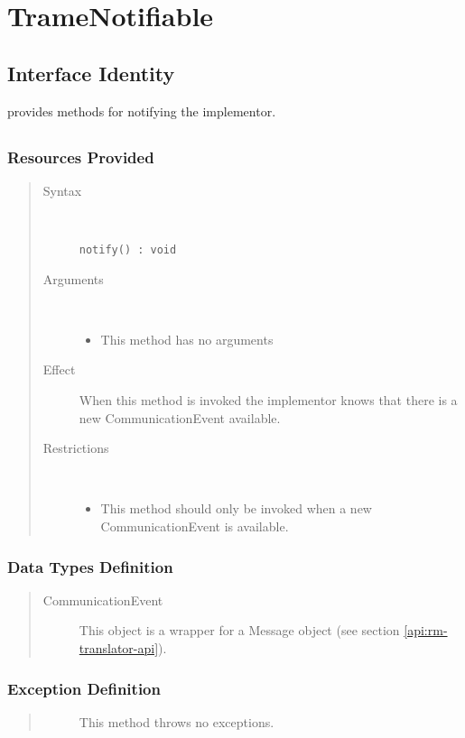 \section{TrameNotifiable}
\label{api:rm-trame-notifiable}

\subsection{Interface Identity}

\npar {} provides methods for notifying the
implementor.

\subsection{}

\subsubsection{Resources Provided}

\begin{quote}
	\begin{description}
		\item[Syntax] \
		\begin{verbatim}
notify() : void
		\end{verbatim}
		\item[Arguments] \
		\begin{itemize}
		  \item This method has no arguments
		\end{itemize}
		\item[Effect] When this method is invoked the implementor knows that there is
		a new CommunicationEvent available.
		\item[Restrictions] \
		\begin{itemize}
		  \item This method should only be invoked when a new CommunicationEvent is
		  available.
		\end{itemize}
	\end{description} 
\end{quote}

\subsubsection{Data Types Definition}

\begin{quote}
	\begin{description}
		\item[CommunicationEvent] This object is a wrapper for a Message object (see
		section \ref{api:rm-translator-api}).
	\end{description} 
\end{quote}

\subsubsection{Exception Definition} 

\begin{quote}
	\begin{description}
		\item[] This method throws no exceptions.
	\end{description} 
\end{quote}